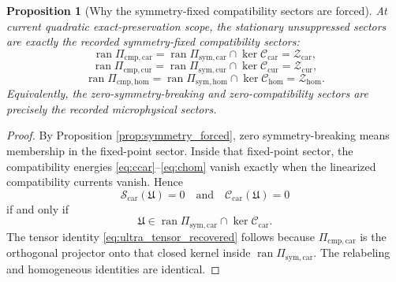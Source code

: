 \documentclass[11pt]{article}
\newcommand{\UltraTensorClass}{\mathscr Z_{\mathrm{car}}}
\newcommand{\UltraRelabelClass}{\mathscr Z_{\mathrm{cur}}}
\newcommand{\UltraFreeClass}{\mathscr Z_{\mathrm{hom}}}
\newcommand{\RootTensor}{\mathfrak U}
\newcommand{\TensorSymProj}{\Pi_{\mathrm{sym,car}}}
\newcommand{\CurSymProj}{\Pi_{\mathrm{sym,cur}}}
\newcommand{\HomSymProj}{\Pi_{\mathrm{sym,hom}}}
\newcommand{\TensorCompat}{\mathcal C_{\mathrm{car}}}
\newcommand{\CurCompat}{\mathcal C_{\mathrm{cur}}}
\newcommand{\HomCompat}{\mathcal C_{\mathrm{hom}}}
\newcommand{\TensorCmpProj}{\Pi_{\mathrm{cmp,car}}}
\newcommand{\CurCmpProj}{\Pi_{\mathrm{cmp,cur}}}
\newcommand{\HomCmpProj}{\Pi_{\mathrm{cmp,hom}}}
\newtheorem{proposition}{Proposition}
\begin{document}
\begin{proposition}[Why the symmetry-fixed compatibility sectors are forced]
\label{prop:compatibility_forced}
At current quadratic exact-preservation scope, the stationary unsuppressed sectors are exactly the recorded symmetry-fixed compatibility sectors:
\begin{equation}
\operatorname{ran}\TensorCmpProj
=
\operatorname{ran}\TensorSymProj\cap\ker\TensorCompat
=
\UltraTensorClass,
\label{eq:ultra_tensor_recovered}
\end{equation}
\begin{equation}
\operatorname{ran}\CurCmpProj
=
\operatorname{ran}\CurSymProj\cap\ker\CurCompat
=
\UltraRelabelClass,
\label{eq:ultra_cur_recovered}
\end{equation}
\begin{equation}
\operatorname{ran}\HomCmpProj
=
\operatorname{ran}\HomSymProj\cap\ker\HomCompat
=
\UltraFreeClass.
\label{eq:ultra_hom_recovered}
\end{equation}
Equivalently, the zero-symmetry-breaking and zero-compatibility sectors are precisely the recorded microphysical sectors.
\end{proposition}

\begin{proof}
By Proposition \ref{prop:symmetry_forced}, zero symmetry-breaking means membership in the fixed-point sector. Inside that fixed-point sector, the compatibility energies \eqref{eq:ccar}--\eqref{eq:chom} vanish exactly when the linearized compatibility currents vanish. Hence
\[
\mathcal S_{\mathrm{car}}(\RootTensor)=0
\quad\text{and}\quad
\mathcal C_{\mathrm{car}}(\RootTensor)=0
\]
if and only if
\[
\RootTensor\in \operatorname{ran}\TensorSymProj\cap\ker\TensorCompat.
\]
The tensor identity \eqref{eq:ultra_tensor_recovered} follows because \(\TensorCmpProj\) is the orthogonal projector onto that closed kernel inside \(\operatorname{ran}\TensorSymProj\). The relabeling and homogeneous identities are identical.
\end{proof}
\end{document}
